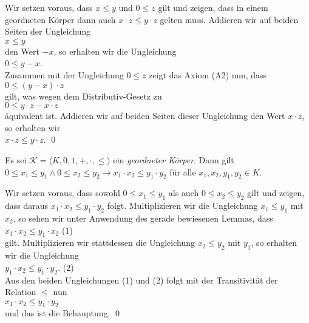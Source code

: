 \proof
Wir setzen voraus, dass  $x \leq y$ und $0 \leq z$ gilt und zeigen, dass in einem geordneten
Körper dann auch $x \cdot z \leq y \cdot z$ gelten muss.  Addieren wir auf beiden Seiten der Ungleichung
\\[0.2cm]
\hspace*{1.3cm}
$x \leq y$
\\[0.2cm]
den Wert $-x$, so erhalten wir die Ungleichung
\\[0.2cm]
\hspace*{1.3cm}
$0 \leq y - x$.
\\[0.2cm]
Zusammen mit der Ungleichung $0 \leq z$ zeigt das Axiom (A2) nun, dass
\\[0.2cm]
\hspace*{1.3cm}
$0 \leq (y - x) \cdot z$
\\[0.2cm]
gilt, was wegen dem Distributiv-Gesetz zu
\\[0.2cm]
\hspace*{1.3cm}
$0 \leq y \cdot z - x \cdot z$
\\[0.2cm]
äquivalent ist.  Addieren wir auf beiden Seiten dieser Ungleichung den Wert $x \cdot z$, so erhalten wir
\\[0.2cm]
\hspace*{1.3cm}
$x \cdot z \leq y \cdot z$.  \qed

\begin{Lemma} \label{lemma:l7}
  Es sei  $\mathcal{K} = \langle K, 0, 1, +, \cdot, \leq \rangle$ ein \emph{geordneter Körper}.
  Dann gilt
  \\[0.2cm]
  \hspace*{1.3cm} $0 \leq x_1 \leq y_1 \wedge 0 \leq x_2 \leq y_2 \rightarrow x_1 \cdot x_2 \leq y_1 \cdot y_2$  
  \quad für alle $x_1,x_2,y_1,y_2 \in K$.
\end{Lemma}

\proof
Wir setzen voraus, dass sowohl $0 \leq x_1 \leq y_1$ als auch $0 \leq x_2 \leq y_2$ gilt und zeigen, dass daraus 
$x_1 \cdot x_2 \leq y_1 \cdot y_2$ folgt.  Multiplizieren wir die Ungleichung $x_1 \leq y_1$ mit
$x_2$, so sehen wir unter Anwendung des gerade bewiesenen Lemmas, dass
\\[0.2cm]
\hspace*{1.3cm}
$x_1 \cdot x_2 \leq y_1 \cdot x_2$  \hspace*{\fill} (1)
\\[0.2cm]
gilt.  Multiplizieren wir stattdessen die Ungleichung $x_2 \leq y_2$ mit $y_1$, so erhalten wir die
Ungleichung 
\\[0.2cm]
\hspace*{1.3cm}
$y_1 \cdot x_2 \leq y_1 \cdot y_2$. \hspace*{\fill} (2)
\\[0.2cm]
Aus den beiden Ungleichungen (1) und (2) folgt mit der Transitivität der Relation $\leq$ nun
\\[0.2cm]
\hspace*{1.3cm}
$x_1 \cdot x_2 \leq y_1 \cdot y_2$
\\[0.2cm]
und das ist die Behauptung.  \qed

